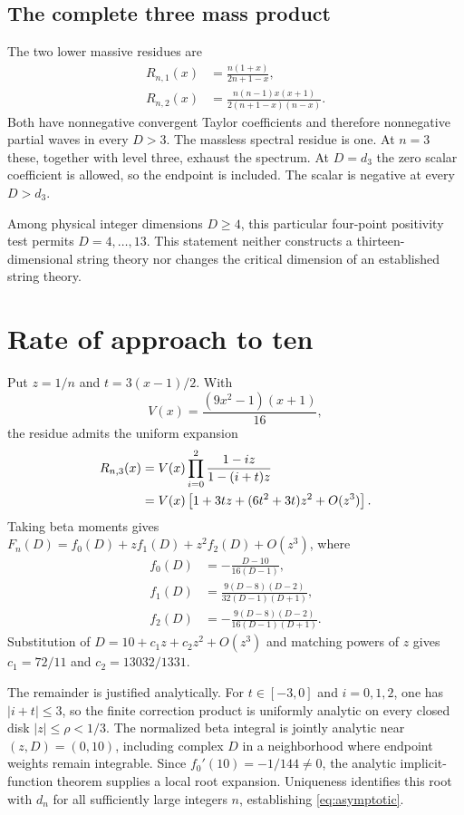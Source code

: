 \documentclass[11pt,a4paper]{article}
\theoremstyle{remark}\newtheorem{remark}[theorem]{Remark}
\begin{document}
\subsection{The complete three mass product}
The two lower massive residues are
\begin{align}\label{eq:lower}
 R_{n,1}(x)&=\frac{n(1+x)}{2n+1-x},\\
 R_{n,2}(x)&=\frac{n(n-1)x(x+1)}{2(n+1-x)(n-x)}.
\end{align}
Both have nonnegative convergent Taylor coefficients and therefore nonnegative partial waves in every $D>3$. The massless spectral residue is one. At $n=3$ these, together with level three, exhaust the spectrum. At $D=d_3$ the zero scalar coefficient is allowed, so the endpoint is included. The scalar is negative at every $D>d_3$.

Among physical integer dimensions $D\geq4$, this particular four-point positivity test permits $D=4,\ldots,13$. This statement neither constructs a thirteen-dimensional string theory nor changes the critical dimension of an established string theory.

\section{Rate of approach to ten}
Put $z=1/n$ and $t=3(x-1)/2$. With
\begin{equation}
 V(x)=\frac{(9x^2-1)(x+1)}{16},
\end{equation}
the residue admits the uniform expansion
\begin{align}
 R_{n,3}(x)
 &=V(x)\prod_{i=0}^{2}\frac{1-iz}{1-(i+t)z}\notag\\
 &=V(x)\left[1+3tz+(6t^2+3t)z^2+O(z^3)\right].
\end{align}
Taking beta moments gives $F_n(D)=f_0(D)+z f_1(D)+z^2f_2(D)+O(z^3)$, where
\begin{align}
 f_0(D)&=-\frac{D-10}{16(D-1)},\\
 f_1(D)&=\frac{9(D-8)(D-2)}{32(D-1)(D+1)},\\
 f_2(D)&=-\frac{9(D-8)(D-2)}{16(D-1)(D+1)}.
\end{align}
Substitution of $D=10+c_1z+c_2z^2+O(z^3)$ and matching powers of $z$ gives $c_1=72/11$ and $c_2=13032/1331$.

The remainder is justified analytically. For $t\in[-3,0]$ and $i=0,1,2$, one has $|i+t|\leq3$, so the finite correction product is uniformly analytic on every closed disk $|z|\leq\rho<1/3$. The normalized beta integral is jointly analytic near $(z,D)=(0,10)$, including complex $D$ in a neighborhood where endpoint weights remain integrable. Since $f_0'(10)=-1/144\neq0$, the analytic implicit-function theorem supplies a local root expansion. Uniqueness identifies this root with $d_n$ for all sufficiently large integers $n$, establishing \eqref{eq:asymptotic}.
\end{document}
